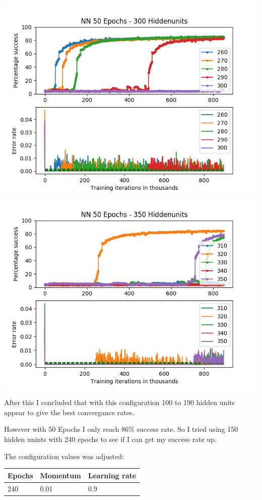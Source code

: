 \documentclass[11pt]{article}
\makeatletter
\def\maxwidth{\ifdim\Gin@nat@width>\linewidth\linewidth
    \else\Gin@nat@width\fi}
\let\Oldincludegraphics\includegraphics
\renewcommand{\includegraphics}[1]{\Oldincludegraphics[width=.8\maxwidth]{#1}}
\makeatother
\begin{document}
\includegraphics{50Epochs_Momentum_03_Experiment3/NN_50Epochs_300Hiddenunits.png}
\includegraphics{50Epochs_Momentum_03_Experiment3/NN_50Epochs_350Hiddenunits.png}

After this I concluded that with this configuration 100 to 190 hidden
units appear to give the best convergance rates.

However with 50 Epochs I only reach 86\% success rate. So I tried using
150 hidden unints with 240 epochs to see if I can get my success rate
up.

The configuration values was adjusted:

\begin{longtable}[]{@{}lll@{}}
\toprule
Epochs & Momentum & Learning rate\tabularnewline
\midrule
\endhead
240 & 0.01 & 0.9\tabularnewline
\bottomrule
\end{longtable}
\end{document}
